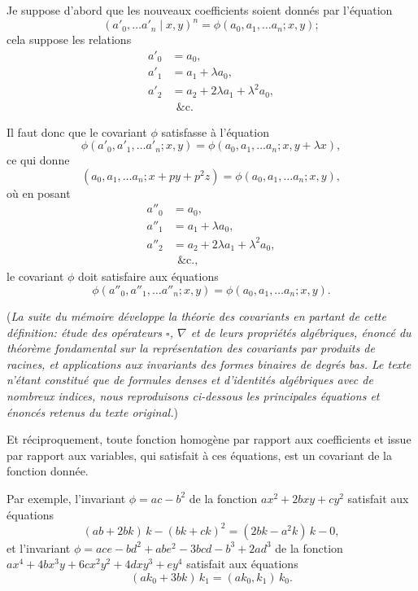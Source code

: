 \documentclass[11pt,a4paper]{article}
\begin{document}
Je suppose d'abord que les nouveaux coefficients soient donn\'es par l'\'equation
\[
(a'_0, \ldots a'_n \mid x, y)^n = \phi(a_0, a_1, \ldots a_n; x, y);
\]
cela suppose les relations
\begin{align*}
a'_0 &= a_0,\\
a'_1 &= a_1 + \lambda a_0,\\
a'_2 &= a_2 + 2\lambda a_1 + \lambda^2 a_0,\\
&\;\,\&\mathrm{c}.
\end{align*}

\medskip

Il faut donc que le covariant $\phi$ satisfasse \`a l'\'equation
\[
\phi(a'_0, a'_1, \ldots a'_n; x, y) = \phi(a_0, a_1, \ldots a_n; x, y + \lambda x),
\]
ce qui donne
\[
(a_0, a_1, \ldots a_n; x + py + p^2 z) = \phi(a_0, a_1, \ldots a_n; x, y),
\]
o\`u en posant
\begin{align*}
a''_0 &= a_0,\\
a''_1 &= a_1 + \lambda a_0,\\
a''_2 &= a_2 + 2\lambda a_1 + \lambda^2 a_0,\\
&\;\,\&\mathrm{c.},
\end{align*}
le covariant $\phi$ doit satisfaire aux \'equations
\[
\phi(a''_0, a''_1, \ldots a''_n; x, y) = \phi(a_0, a_1, \ldots a_n; x, y).
\]

\medskip

\noindent (\emph{La suite du m\'emoire d\'eveloppe la th\'eorie des covariants en partant de cette d\'efinition: \'etude des op\'erateurs $\square$, $\nabla$ et de leurs propri\'et\'es alg\'ebriques, \'enonc\'e du th\'eor\`eme fondamental sur la repr\'esentation des covariants par produits de racines, et applications aux invariants des formes binaires de degr\'es bas. Le texte n'\'etant constitu\'e que de formules denses et d'identit\'es alg\'ebriques avec de nombreux indices, nous reproduisons ci-dessous les principales \'equations et \'enonc\'es retenus du texte original.})

\medskip

Et r\'eciproquement, toute fonction homog\`ene par rapport aux coefficients et issue par rapport aux variables, qui satisfait \`a ces \'equations, est un covariant de la fonction donn\'ee.

\medskip

Par exemple, l'invariant $\phi = ac - b^2$ de la fonction $ax^2 + 2bxy + cy^2$ satisfait aux \'equations
\[
(ab + 2bk)\,k - (bk + ck)^2 = (2bk - a^2k)\,k - 0,
\]
et l'invariant $\phi = ace - bd^2 + abe^2 - 3 bcd - b^3 + 2ad^3$ de la fonction $ax^4 + 4 b x^3 y + 6 c x^2 y^2 + 4 d x y^3 + e y^4$ satisfait aux \'equations
\[
(a k_{0} + 3 b k)\, k_{1} = (a k_{0}, k_{1})\,k_{0}.
\]
\end{document}
